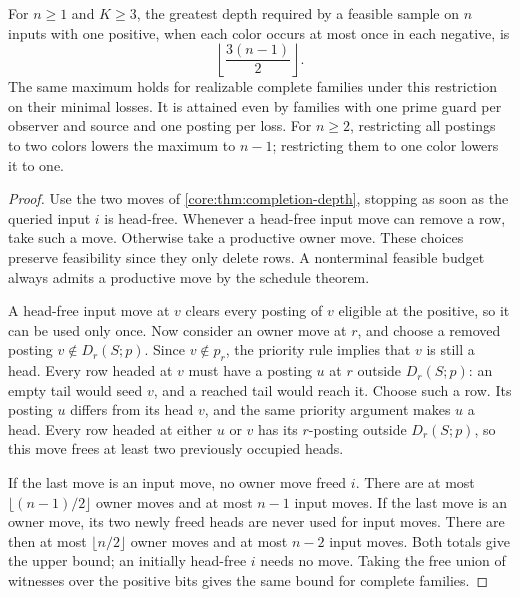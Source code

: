 \begin{theorem}
\label{core:thm:additive-completion-depth}
For $n\ge1$ and $K\ge3$, the greatest depth required by a feasible
sample on $n$ inputs with one positive, when each color occurs at most
once in each negative, is
\[
                         \left\lfloor\frac{3(n-1)}2\right\rfloor .
\]
The same maximum holds for realizable complete families under this
restriction on their minimal losses. It is attained even by families
with one prime guard per observer and source and one posting per loss.
For $n\ge2$, restricting all postings to two colors lowers the maximum
to $n-1$; restricting them to one color lowers it to one.
\end{theorem}
\begin{proof}
Use the two moves of \cref{core:thm:completion-depth}, stopping as
soon as the queried input $i$ is head-free. Whenever a head-free
input move can remove a row, take such a move. Otherwise take a
productive owner move. These choices preserve feasibility since
they only delete rows. A nonterminal feasible budget always admits
a productive move by the schedule theorem.

A head-free input move at $v$ clears every posting of $v$ eligible
at the positive, so it can be used only once. Now consider an owner
move at $r$, and choose a removed posting $v\notin D_r(S;p)$.
Since $v\notin p_r$, the priority rule implies that $v$ is still a
head. Every row headed at $v$ must have a posting $u$ at $r$ outside
$D_r(S;p)$: an empty tail would seed $v$, and a reached tail would
reach it. Choose such a row. Its posting $u$ differs from its head
$v$, and the same priority argument makes $u$ a head. Every row
headed at either $u$ or $v$ has its $r$-posting outside $D_r(S;p)$,
so this move frees at least two previously occupied heads.

If the last move is an input move, no owner move freed $i$. There
are at most $\lfloor(n-1)/2\rfloor$ owner moves and at most $n-1$
input moves. If the last move is an owner move, its two newly freed
heads are never used for input moves. There are then at most
$\lfloor n/2\rfloor$ owner moves and at most $n-2$ input moves.
Both totals give the upper bound; an initially head-free $i$ needs
no move. Taking the free union of witnesses over the positive bits
gives the same bound for complete families.


\end{proof}
